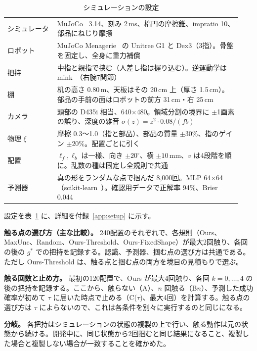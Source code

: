 \documentclass[conference]{IEEEtran}
\newcommand{\Ours}{Ours}
\newcommand{\Unc}{MaxUnc}
\newcommand{\Rand}{Random}
\newcommand{\Geom}{Ours-Threshold}
\newcommand{\Fix}{Ours-FixedShape}
\begin{document}
\begin{table}[t]
\caption{シミュレーションの設定}
\label{tab:setup}
\centering
\small
\begin{tabular}{@{}p{0.2\linewidth}p{0.74\linewidth}@{}}
\toprule
シミュレータ & MuJoCo~\cite{todorov2012mujoco} 3.14、刻み 2\,ms、楕円の摩擦錐、impratio 10、部品にねじり摩擦 \\
ロボット & MuJoCo Menagerie~\cite{menagerie2022} の Unitree G1 と Dex3（3指）。骨盤を固定し、全身に重力補償 \\
把持 & 中指と親指で挟む（人差し指は握り込む）。逆運動学は mink~\cite{zakka2024mink}（右腕7関節） \\
棚 & 机の高さ 0.80\,m、天板はその 20\,cm 上（厚さ 1.5\,cm）。部品の手前の面はロボットの前方 31\,cm・右 25\,cm \\
カメラ & 頭部の D435i 相当、640$\times$480。領域分割の境界に $\pm$1画素の誤り、深度の雑音 $\sigma(z)=z^2\cdot0.08/(f b)$ \\
物理 $\xi$ & 摩擦 0.3〜1.0（指と部品）、部品の質量 $\pm$30\%、指のゲイン $\pm$20\%。配置ごとに引く \\
配置 & $\ell_f,\ell_b$ は一様、向き $\pm20^\circ$、横 $\pm10$\,mm、$v$ は4段階を順に。乱数の種は固定し全規則で共通 \\
予測器 & 真の形をランダムな点で掴んだ 8,000回。MLP 64$\times$64（scikit-learn~\cite{pedregosa2011sklearn}）。確認用データで正解率 94\%、Brier 0.044 \\
\bottomrule
\end{tabular}
\end{table}

設定を表~\ref{tab:setup} に、詳細を付録~\ref{app:setup} に示す。

\textbf{触る点の選び方（主な比較）。} 240配置のそれぞれで、各規則（\Ours、\Unc、\Rand、\Geom、\Fix）が最大2回触り、各回の後の $g^*$ での把持を記録する。認識、予測器、掴む点の選び方は共通である。ただし \Geom{} は、触る点と掴む点の両方を境目の見積もりで選ぶ。

\textbf{触る回数と止め方。} 最初の120配置で、\Ours{} が最大4回触り、各回 $k=0,\dots,4$ の後の把持を記録する。ここから、触らない（A）、$n$ 回触る（B$n$）、予測した成功確率が初めて $\tau$ に届いた時点で止める（C($\tau$)、最大4回）を計算する。触る点の選び方は $\tau$ によらないので、これは各条件を別々に実行するのと同じになる。

\textbf{分岐。} 各把持はシミュレーションの状態の複製の上で行い、触る動作は元の状態から続ける。開発中に、同じ状態から2回掴むと同じ結果になること、複製した場合と複製しない場合が一致することを確かめた。
\end{document}
